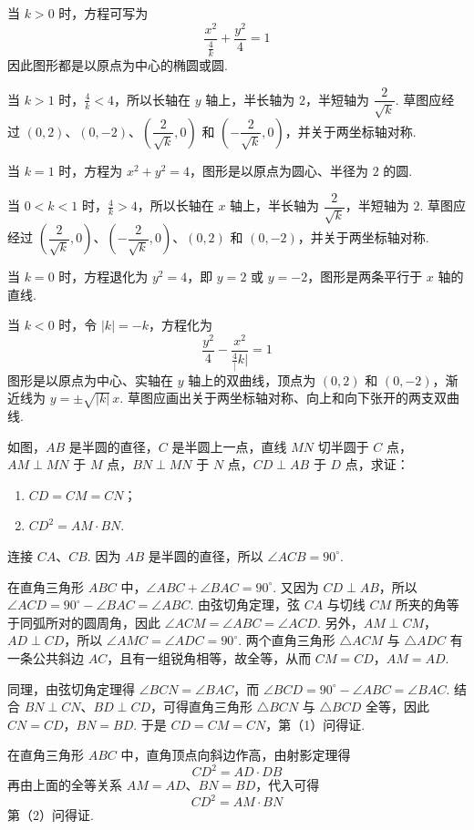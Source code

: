 \documentclass[UTF8,a4paper,oneside,11pt]{ctexbook}
\begin{document}
\begin{solution}
当 \(k>0\) 时，方程可写为
\[
\frac{x^{2}}{\frac{4}{k}}+\frac{y^{2}}{4}=1
\]
因此图形都是以原点为中心的椭圆或圆.

当 \(k>1\) 时，\(\frac{4}{k}<4\)，所以长轴在 \(y\) 轴上，半长轴为 \(2\)，半短轴为 \(\dfrac{2}{\sqrt{k}}\). 草图应经过 \((0,2)\)、\((0,-2)\)、\(\left(\dfrac{2}{\sqrt{k}},0\right)\) 和 \(\left(-\dfrac{2}{\sqrt{k}},0\right)\)，并关于两坐标轴对称.

当 \(k=1\) 时，方程为 \(x^{2}+y^{2}=4\)，图形是以原点为圆心、半径为 \(2\) 的圆.

当 \(0<k<1\) 时，\(\frac{4}{k}>4\)，所以长轴在 \(x\) 轴上，半长轴为 \(\dfrac{2}{\sqrt{k}}\)，半短轴为 \(2\). 草图应经过 \(\left(\dfrac{2}{\sqrt{k}},0\right)\)、\(\left(-\dfrac{2}{\sqrt{k}},0\right)\)、\((0,2)\) 和 \((0,-2)\)，并关于两坐标轴对称.

当 \(k=0\) 时，方程退化为 \(y^{2}=4\)，即 \(y=2\) 或 \(y=-2\)，图形是两条平行于 \(x\) 轴的直线.

当 \(k<0\) 时，令 \(\lvert k\rvert=-k\)，方程化为
\[
\frac{y^{2}}{4}-\frac{x^{2}}{\frac{4}{\lvert} k\rvert}=1
\]
图形是以原点为中心、实轴在 \(y\) 轴上的双曲线，顶点为 \((0,2)\) 和 \((0,-2)\)，渐近线为 \(y=\pm\sqrt{\lvert k\rvert}\,x\). 草图应画出关于两坐标轴对称、向上和向下张开的两支双曲线.
\end{solution}

\begin{problem}
如图，\(AB\) 是半圆的直径，\(C\) 是半圆上一点，直线 \(MN\) 切半圆于 \(C\) 点，\(AM\perp MN\) 于 \(M\) 点，\(BN\perp MN\) 于 \(N\) 点，\(CD\perp AB\) 于 \(D\) 点，求证：

\begin{enumerate}
\item \(CD=CM=CN\)；
\item \(CD^{2}=AM\cdot BN\).
\end{enumerate}

\end{problem}

\begin{solution}
连接 \(CA\)、\(CB\). 因为 \(AB\) 是半圆的直径，所以 \(\angle ACB=90^{\circ}\).

在直角三角形 \(ABC\) 中，\(\angle ABC+\angle BAC=90^{\circ}\). 又因为 \(CD\perp AB\)，所以 \(\angle ACD=90^{\circ}-\angle BAC=\angle ABC\). 由弦切角定理，弦 \(CA\) 与切线 \(CM\) 所夹的角等于同弧所对的圆周角，因此 \(\angle ACM=\angle ABC=\angle ACD\). 另外，\(AM\perp CM\)，\(AD\perp CD\)，所以 \(\angle AMC=\angle ADC=90^{\circ}\). 两个直角三角形 \(\triangle ACM\) 与 \(\triangle ADC\) 有一条公共斜边 \(AC\)，且有一组锐角相等，故全等，从而
\(CM=CD\)，\(AM=AD\).

同理，由弦切角定理得 \(\angle BCN=\angle BAC\)，而 \(\angle BCD=90^{\circ}-\angle ABC=\angle BAC\). 结合 \(BN\perp CN\)、\(BD\perp CD\)，可得直角三角形 \(\triangle BCN\) 与 \(\triangle BCD\) 全等，因此
\(CN=CD\)，\(BN=BD\).
于是 \(CD=CM=CN\)，第（1）问得证.

在直角三角形 \(ABC\) 中，直角顶点向斜边作高，由射影定理得
\[
CD^{2}=AD\cdot DB
\]
再由上面的全等关系 \(AM=AD\)、\(BN=BD\)，代入可得
\[
CD^{2}=AM\cdot BN
\]
第（2）问得证.
\end{solution}
\end{document}
